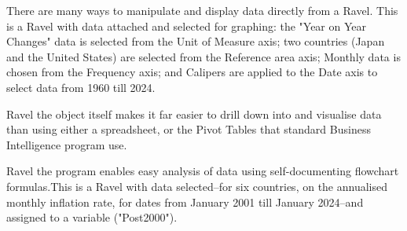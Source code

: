 There are many ways to manipulate and display data directly from a Ravel. This is a Ravel with data attached and selected for graphing: the "Year on Year Changes" data is selected from the Unit of Measure axis; two countries (Japan and the United States) are selected from the Reference area axis; Monthly data is chosen from the Frequency axis; and Calipers are applied to the Date axis to select data from 1960 till 2024.


Ravel the object itself makes it far easier to drill down into and visualise data than using either a spreadsheet, or the Pivot Tables that standard Business Intelligence program use.

Ravel the program enables easy analysis of data using self-documenting flowchart formulas.This is a Ravel with data selected--for six countries, on the annualised monthly inflation rate, for dates from January 2001 till January 2024--and assigned to a variable ("Post2000").

